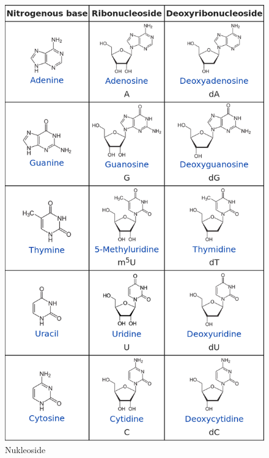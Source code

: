 \documentclass[a4paper,twocolumn,english,fontsize=7,DIV=16]{scrartcl}
\begin{document}
\begin{figure}
	\centering
	\includegraphics[width=\linewidth]{img/nukleoside.png}
	\caption{Nukleoside}
\end{figure}
\end{document}
